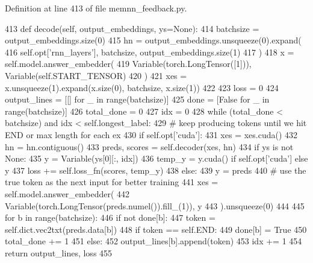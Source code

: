 Definition at line 413 of file memnn\+\_\+feedback.\+py.


\begin{DoxyCode}
413     \textcolor{keyword}{def }decode(self, output\_embeddings, ys=None):
414         batchsize = output\_embeddings.size(0)
415         hn = output\_embeddings.unsqueeze(0).expand(
416             self.opt[\textcolor{stringliteral}{'rnn\_layers'}], batchsize, output\_embeddings.size(1)
417         )
418         x = self.model.answer\_embedder(
419             Variable(torch.LongTensor([1])), Variable(self.START\_TENSOR)
420         )
421         xes = x.unsqueeze(1).expand(x.size(0), batchsize, x.size(1))
422 
423         loss = 0
424         output\_lines = [[] \textcolor{keywordflow}{for} \_ \textcolor{keywordflow}{in} range(batchsize)]
425         done = [\textcolor{keyword}{False} \textcolor{keywordflow}{for} \_ \textcolor{keywordflow}{in} range(batchsize)]
426         total\_done = 0
427         idx = 0
428         \textcolor{keywordflow}{while} (total\_done < batchsize) \textcolor{keywordflow}{and} idx < self.longest\_label:
429             \textcolor{comment}{# keep producing tokens until we hit END or max length for each ex}
430             \textcolor{keywordflow}{if} self.opt[\textcolor{stringliteral}{'cuda'}]:
431                 xes = xes.cuda()
432                 hn = hn.contiguous()
433             preds, scores = self.decoder(xes, hn)
434             \textcolor{keywordflow}{if} ys \textcolor{keywordflow}{is} \textcolor{keywordflow}{not} \textcolor{keywordtype}{None}:
435                 y = Variable(ys[0][:, idx])
436                 temp\_y = y.cuda() \textcolor{keywordflow}{if} self.opt[\textcolor{stringliteral}{'cuda'}] \textcolor{keywordflow}{else} y
437                 loss += self.loss\_fn(scores, temp\_y)
438             \textcolor{keywordflow}{else}:
439                 y = preds
440             \textcolor{comment}{# use the true token as the next input for better training}
441             xes = self.model.answer\_embedder(
442                 Variable(torch.LongTensor(preds.numel()).fill\_(1)), y
443             ).unsqueeze(0)
444 
445             \textcolor{keywordflow}{for} b \textcolor{keywordflow}{in} range(batchsize):
446                 \textcolor{keywordflow}{if} \textcolor{keywordflow}{not} done[b]:
447                     token = self.dict.vec2txt(preds.data[b])
448                     \textcolor{keywordflow}{if} token == self.END:
449                         done[b] = \textcolor{keyword}{True}
450                         total\_done += 1
451                     \textcolor{keywordflow}{else}:
452                         output\_lines[b].append(token)
453             idx += 1
454         \textcolor{keywordflow}{return} output\_lines, loss
455 
\end{DoxyCode}

